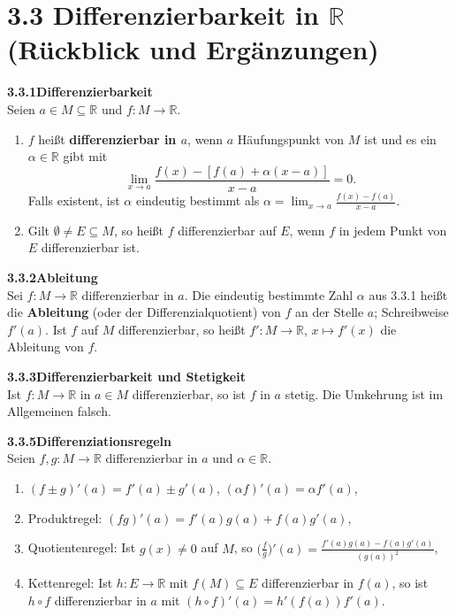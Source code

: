 \documentclass[a4paper,12pt]{article}
\newcommand{\gentry}[3]{%
  \noindent\textbf{#1\quad #2}\nopagebreak\\[0.2em]
  #3\par\smallskip
}
\begin{document}
\section*{3.3 \quad Differenzierbarkeit in $\mathbb{R}$ (R\"uckblick und Erg\"anzungen)}

\gentry{3.3.1}{Differenzierbarkeit}{%
  Seien $a \in M \subseteq \mathbb{R}$ und $f : M \to \mathbb{R}$.
  \begin{enumerate}[label=(\roman*),topsep=2pt,itemsep=1pt]
    \item $f$ hei{\ss}t \textbf{differenzierbar in $a$}, wenn $a$ H\"aufungspunkt von $M$ ist
          und es ein $\alpha \in \mathbb{R}$ gibt mit
          \[
            \lim_{x \to a} \frac{f(x) - [f(a) + \alpha(x - a)]}{x - a} = 0.
          \]
          Falls existent, ist $\alpha$ eindeutig bestimmt als
          $\alpha = \lim_{x \to a} \tfrac{f(x) - f(a)}{x - a}$.
    \item Gilt $\emptyset \neq E \subseteq M$, so hei{\ss}t $f$ differenzierbar auf $E$, wenn $f$
          in jedem Punkt von $E$ differenzierbar ist.
  \end{enumerate}
}

\gentry{3.3.2}{Ableitung}{%
  Sei $f : M \to \mathbb{R}$ differenzierbar in $a$.
  Die eindeutig bestimmte Zahl $\alpha$ aus 3.3.1 hei{\ss}t die \textbf{Ableitung} (oder
  der Differenzialquotient) von $f$ an der Stelle $a$; Schreibweise $f'(a)$.
  Ist $f$ auf $M$ differenzierbar, so hei{\ss}t $f' : M \to \mathbb{R}$, $x \mapsto f'(x)$
  die Ableitung von $f$.
}

\gentry{3.3.3}{Differenzierbarkeit und Stetigkeit}{%
  Ist $f : M \to \mathbb{R}$ in $a \in M$ differenzierbar, so ist $f$ in $a$ stetig.
  Die Umkehrung ist im Allgemeinen falsch.
}

\gentry{3.3.5}{Differenziationsregeln}{%
  Seien $f, g : M \to \mathbb{R}$ differenzierbar in $a$ und $\alpha \in \mathbb{R}$.
  \begin{enumerate}[label=(\roman*),topsep=2pt,itemsep=1pt]
    \item $(f \pm g)'(a) = f'(a) \pm g'(a)$, $(\alpha f)'(a) = \alpha f'(a)$,
    \item Produktregel: $(f g)'(a) = f'(a) g(a) + f(a) g'(a)$,
    \item Quotientenregel: Ist $g(x) \neq 0$ auf $M$, so
          $\bigl(\tfrac{f}{g}\bigr)'(a) = \tfrac{f'(a) g(a) - f(a) g'(a)}{(g(a))^2}$,
    \item Kettenregel: Ist $h : E \to \mathbb{R}$ mit $f(M) \subseteq E$ differenzierbar
          in $f(a)$, so ist $h \circ f$ differenzierbar in $a$ mit
          $(h \circ f)'(a) = h'(f(a)) f'(a)$.
  \end{enumerate}
}
\end{document}
